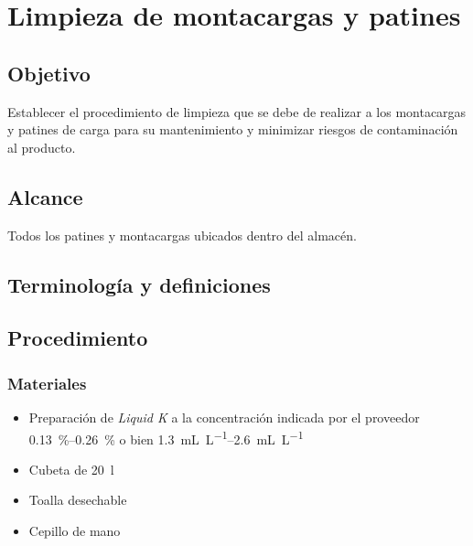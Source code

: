 \thispagestyle{formato-PI}
\renewcommand{\MayorVer}{2}
\renewcommand{\MenorVer}{0}
\renewcommand{\Titulo}{Limpieza de montacargas y patines}
\renewcommand{\Codigo}{HYS-5-IT}
\renewcommand{\FechaPub}{2023--01}

\section{\Titulo}

\subsection{Objetivo}
Establecer el procedimiento de limpieza que se debe de realizar a los montacargas y patines de carga para su mantenimiento y minimizar riesgos de contaminación al producto.

\subsection{Alcance}
Todos los patines y montacargas ubicados dentro del almacén.

\subsection{Terminología y definiciones}
\begin{description}
\end{description}

\subsection{Procedimiento}

\subsubsection{Materiales}

\begin{itemize}
	\item Preparación de \textit{Liquid K} a la concentración indicada por el proveedor \qtyrange{0.13}{0.26}{\percent} o bien \qtyrange{1.3}{2.6}{\milli\liter\per\liter}
	\item Cubeta de \qty{20}{\litre}
	\item Toalla desechable
	\item Cepillo de mano
\end{itemize}

